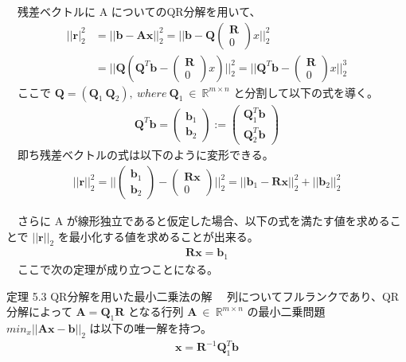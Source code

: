 \documentclass[dvipdfmx,10pt,presentation]{beamer}
\begin{document}
\begin{frame}[allowframebreaks]{}
　残差ベクトルに A についてのQR分解を用いて、\\
\begin{align*}
||\bm{r}|_2^2&=||\bm{b}-\bm{A}\bm{x}||_2^2=||\bm{b}-\bm{Q}\begin{pmatrix}\bm{R}\\0\end{pmatrix}x||^2_2 \\
&=||\bm{Q}(\bm{Q}^T\bm{b}-\begin{pmatrix}\bm{R}\\0\end{pmatrix}x)||^2_2=||\bm{Q}^T\bm{b}-\begin{pmatrix}\bm{R}\\0\end{pmatrix}x||^3_2
\end{align*}
　ここで \(\bm{Q}=(\bm{Q}_1\ \bm{Q}_2),\ where\ \bm{Q}_1\ \in\ \mathbb{R}^{m\times n}\) と分割して以下の式を導く。\\
 \begin{align*}
\bm{Q}^T\bm{b}=\begin{pmatrix}\bm{b}_1\\\bm{b}_2\end{pmatrix}:=\begin{pmatrix}\bm{Q}^T_1\bm{b}\\\bm{Q}^T_2\bm{b}\end{pmatrix}
\end{align*}
　即ち残差ベクトルの式は以下のように変形できる。\\
\begin{align}
||\bm{r}||^2_2=||\begin{pmatrix}\bm{b}_1\\\bm{b}_2\end{pmatrix}-\begin{pmatrix}\bm{R}\bm{x}\\0\end{pmatrix}||^2_2=||\bm{b}_1-\bm{R}\bm{x}||^2_2+||\bm{b}_2||^2_2
\tag{5.4}
\end{align}

　さらに A が線形独立であると仮定した場合、以下の式を満たす値を求めることで \(||\bm{r}||_2\) を最小化する値を求めることが出来る。\\
\begin{align*}
\bm{R}\bm{x}=\bm{b}_1
\end{align*}
　ここで次の定理が成り立つことになる。\\

\begin{block}{定理 5.3 QR分解を用いた最小二乗法の解}
　列についてフルランクであり、QR分解によって \(\bm{A}=\bm{Q}_1\bm{R}\) となる行列 \(\bm{A}\ \in\ \mathbb{R}^{m\times n}\) の最小二乗問題 \(min_x||\bm{A}\bm{x}-\bm{b}||_2\) は以下の唯一解を持つ。\\
\begin{align*}
\bm{x}=\bm{R}^{-1}\bm{Q}_1^T\bm{b}
\end{align*}
\end{block}
\end{frame}
\end{document}
